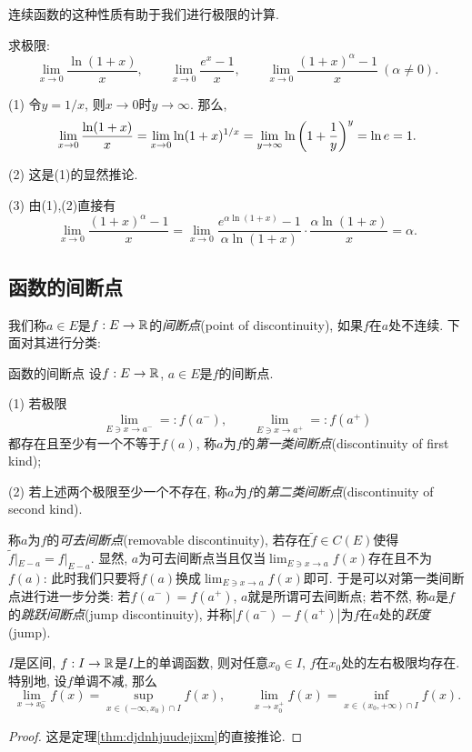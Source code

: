 连续函数的这种性质有助于我们进行极限的计算. 

\begin{example}
	求极限: $$\lim_{x\to 0} \frac{\ln (1+x)}{x}, \qquad \lim_{x\to 0} \frac{e^x-1}{x},\qquad \lim_{x\to 0} \frac{(1+x)^{\alpha}-1}{x}~(\alpha \neq 0). $$
\end{example}
\begin{solution}
	(1) 令$y=1/x$, 则$x \to 0$时$y \to \infty$. 那么, $$\lim_{x\to 0} \frac{\ln (1+x)}{x} = \lim_{x\to 0} \ln (1+x)^{1/x} = \lim_{y\to \infty} \ln \left( 1+\frac{1}{y} \right)^y = \ln e = 1.$$
	
	(2) 这是(1)的显然推论. 
	
	(3) 由(1),(2)直接有$$\lim_{x\to 0} \frac{(1+x)^{\alpha}-1}{x} = \lim_{x\to 0} \frac{e^{\alpha \ln (1+x)}-1}{\alpha \ln (1+x)} \cdot \frac{\alpha \ln (1+x)}{x} = \alpha .$$
\end{solution}


\subsection{函数的间断点}

我们称$a \in E$是$f: E \to \mathbb{R}$的\textit{间断点}(point of discontinuity), 如果$f$在$a$处不连续. 下面对其进行分类: 

\begin{definition}{函数的间断点}
	设$f: E \to \mathbb{R}$, $a \in E$是$f$的间断点. 
	
	(1) 若极限$$\lim_{E \ni x \to a^-}=:f(a^-), \qquad \lim_{E \ni x \to a^+}=:f(a^+)$$都存在且至少有一个不等于$f(a)$, 称$a$为$f$的\textit{第一类间断点}(discontinuity of first kind); 
	
	(2) 若上述两个极限至少一个不存在, 称$a$为$f$的\textit{第二类间断点}(discontinuity of second kind). 
\end{definition}

称$a$为$f$的\textit{可去间断点}(removable discontinuity), 若存在$\tilde{f} \in C(E)$使得$\tilde{f} |_{E-a} = f |_{E-a}$. 显然, $a$为可去间断点当且仅当$\lim_{E \ni x \to a}f(x)$存在且不为$f(a)$: 此时我们只要将$f(a)$换成$\lim_{E \ni x \to a}f(x)$即可. 于是可以对第一类间断点进行进一步分类: 若$f(a^-) = f(a^+)$, $a$就是所谓可去间断点; 若不然, 称$a$是$f$的\textit{跳跃间断点}(jump discontinuity), 并称$|f(a^-) - f(a^+)|$为$f$在$a$处的\textit{跃度}(jump). 

\begin{lemma}{}\label{lem:djdnhjuuzoyzjixm}
	$I$是区间, $f:I \to \mathbb{R}$是$I$上的单调函数, 则对任意$x_0 \in I$, $f$在$x_0$处的左右极限均存在. 特别地, 设$f$单调不减, 那么$$\lim_{x \to x_0^-} f(x) = \sup_{x \in (-\infty,x_0) \cap I} f(x),\qquad \lim_{x \to x_0^+} f(x) = \inf_{x \in (x_0,+\infty) \cap I} f(x).$$
\end{lemma}
\begin{proof}
	这是定理\ref{thm:djdnhjuudejixm}的直接推论. 
\end{proof}

